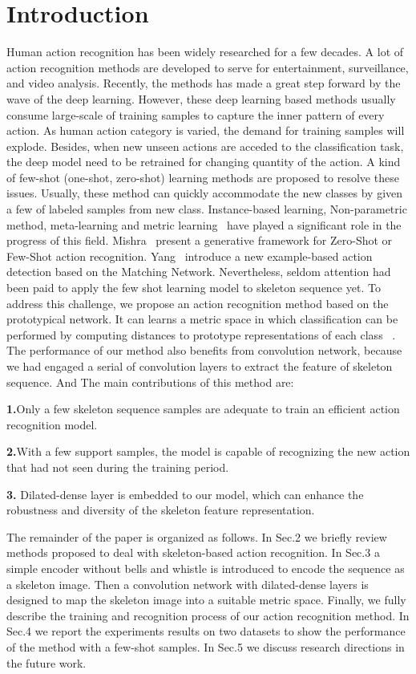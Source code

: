 \documentclass{bmvc2k}
\begin{document}
\section{Introduction}
\label{sec:intro}
Human action recognition has been widely researched for a few decades. A lot of action recognition methods are developed to serve for entertainment, surveillance, and video analysis. Recently, the methods has made a great step forward by the wave of the deep learning. However, these deep learning based methods usually consume large-scale of training samples to capture the inner pattern of every action. As human action category is varied, the demand for training samples will explode. Besides, when new unseen actions are acceded to the classification task, the deep model need to be retrained for changing quantity of the action. A kind of few-shot (one-shot, zero-shot) learning methods are proposed to resolve these issues. Usually, these method can quickly accommodate the new classes by given a few of labeled samples from new class. Instance-based learning, Non-parametric method, meta-learning and metric learning~\cite{davis2007information} have played a significant role in the progress of this field. Mishra~\cite{mishra2018generative} present a generative framework for Zero-Shot or Few-Shot action recognition. Yang~\cite{yang2018one} introduce a new example-based action detection based on the Matching Network. Nevertheless, seldom attention had been paid to apply the few shot learning model to skeleton sequence yet. To address this challenge, we propose an action recognition method based on the prototypical network. It can learns a metric space in which classification can be performed by computing distances to prototype representations of each class ~\cite{snell2017prototypical}. The performance of our method also benefits from convolution network, because we had engaged a serial of convolution layers to extract the feature of skeleton sequence. And The main contributions of this method are:

\textbf{1.}Only a few skeleton sequence samples are adequate to train an efficient action recognition model.

\textbf{2.}With a few support samples, the model is capable of recognizing the new action that had not seen during the training period.

\textbf{3.}	Dilated-dense layer is embedded to our model, which can enhance the robustness and diversity of the skeleton feature representation. 

The remainder of the paper is organized as follows. In Sec.2 we briefly review methods proposed to deal with skeleton-based action recognition. In Sec.3 a simple encoder without bells and whistle is introduced to encode the sequence as a skeleton image. Then a convolution network with dilated-dense layers is designed to map the skeleton image into a suitable metric space. Finally, we fully describe the training and recognition process of our action recognition method. In Sec.4 we report the experiments results on two datasets to show the performance of the method with a few-shot samples. In Sec.5 we discuss research directions in the future work.
\end{document}
